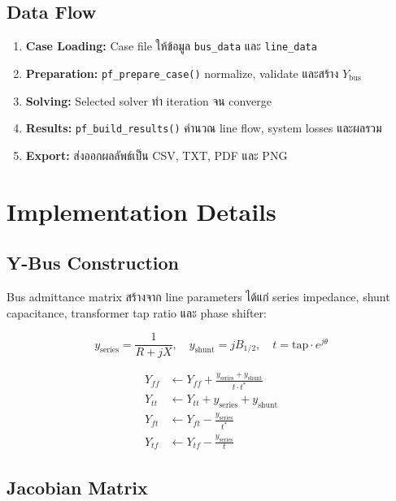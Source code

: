 \documentclass[12pt,a4paper]{article}
\begin{document}
\subsection{Data Flow}

\begin{enumerate}
    \item \textbf{Case Loading:} Case file ให้ข้อมูล \texttt{bus\_data} และ \texttt{line\_data}
    \item \textbf{Preparation:} \texttt{pf\_prepare\_case()} normalize, validate และสร้าง $Y_{\text{bus}}$
    \item \textbf{Solving:} Selected solver ทำ iteration จน converge
    \item \textbf{Results:} \texttt{pf\_build\_results()} คำนวณ line flow, system losses และผลรวม
    \item \textbf{Export:} ส่งออกผลลัพธ์เป็น CSV, TXT, PDF และ PNG
\end{enumerate}

\section{Implementation Details}

\subsection{Y-Bus Construction}

Bus admittance matrix สร้างจาก line parameters ได้แก่ series impedance, shunt capacitance, transformer tap ratio และ phase shifter:

\begin{equation}
y_{\text{series}} = \frac{1}{R + jX}, \quad y_{\text{shunt}} = jB_{1/2}, \quad t = \text{tap} \cdot e^{j\theta}
\end{equation}

\begin{align}
Y_{ff} &\leftarrow Y_{ff} + \frac{y_{\text{series}} + y_{\text{shunt}}}{t \cdot t^*} \\
Y_{tt} &\leftarrow Y_{tt} + y_{\text{series}} + y_{\text{shunt}} \\
Y_{ft} &\leftarrow Y_{ft} - \frac{y_{\text{series}}}{t^*} \\
Y_{tf} &\leftarrow Y_{tf} - \frac{y_{\text{series}}}{t}
\end{align}

\subsection{Jacobian Matrix}
\end{document}
